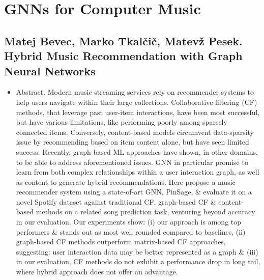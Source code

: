 \documentclass{article}
\begin{document}

\section{GNNs for Computer Music}


\subsection{{\sc Matej Bevec, Marko Tkalčič, Matevž Pesek}. Hybrid Music Recommendation with Graph Neural Networks}

\begin{itemize}
    \item {\sf Abstract.} Modern music streaming services rely on recommender systems to help users navigate within their large collections. Collaborative filtering (CF) methods, that leverage past user-item interactions, have been most successful, but have various limitations, like performing poorly among sparsely connected items. Conversely, content-based models circumvent data-sparsity issue by recommending based on item content alone, but have seen limited success. Recently, graph-based ML approaches have shown, in other domains, to be able to address aforementioned issues. GNN in particular promise to learn from both complex relationships within a user interaction graph, as well as content to generate hybrid recommendations. Here propose a music recommender system using a state-of-art GNN, PinSage, \& evaluate it on a novel Spotify dataset against traditional CF, graph-based CF \& content-based methods on a related song prediction task, venturing beyond accuracy in our evaluation. Our experiments show: (i) our approach is among top performers \& stands out as most well rounded compared to baselines, (ii) graph-based CF methods outperform matrix-based CF approaches, suggesting: user interaction data may be better represented as a graph \& (iii) in our evaluation, CF methods do not exhibit a performance drop in long tail, where hybrid approach does not offer an advantage.


\end{itemize}
\end{document}
